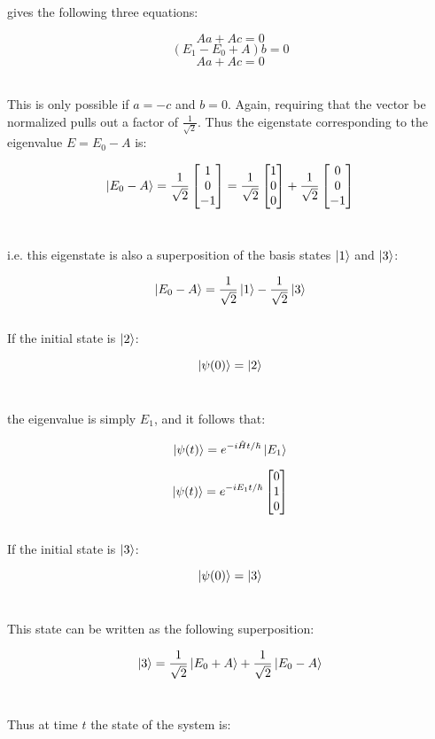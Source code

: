 \documentclass[14pt]{extarticle}
\begin{document}
gives the following three equations:

$$Aa+Ac = 0$$
$$(E_1 - E_0 +A)b = 0$$
$$Aa+Ac = 0$$ \ 

This is only possible if $a = -c$ and $b = 0$. Again, requiring that the vector be normalized pulls out a factor of $\frac{1}{\sqrt 2}$. Thus the eigenstate corresponding to the eigenvalue $E = E_0-A$ is:

$$\ket{E_0-A} = \frac{1}{\sqrt 2}
\begin{bmatrix} 1 \\ 0 \\ -1 \end{bmatrix} = 
\frac{1}{\sqrt 2}
\begin{bmatrix} 1 \\ 0 \\ 0 \end{bmatrix} +
\frac{1}{\sqrt 2}
\begin{bmatrix} 0 \\ 0 \\ -1 \end{bmatrix}
$$ \ 

i.e. this eigenstate is also a superposition of the basis states $\ket 1$ and $\ket 3$:

$$\ket{E_0-A} = \frac{1}{\sqrt 2} \ket 1 - \frac{1}{\sqrt 2} \ket 3$$ \\ 




If the initial state is $\ket 2$:

$$\ket{\psi(0)} = \ket 2$$ \ 

the eigenvalue is simply $E_1$, and it follows that:

$$\ket{\psi(t)} = e^{-i \hat Ht/\hbar}  \ket{E_1}$$

$$
\ket{\psi(t)} = e^{-i E_1 t/ \hbar} 
\begin{bmatrix}
        0 \\ 1 \\ 0
\end{bmatrix}
$$ \\  

If the initial state is $\ket 3$: 

$$\ket{\psi(0)} = \ket 3$$ \
 
This state can be written as the following superposition:

$$\ket 3 = \frac{1}{\sqrt 2} \ket{E_0+A} + \frac{1}{\sqrt 2} \ket{E_0-A}$$ \ 

Thus at time $t$ the state of the system is:
\end{document}
